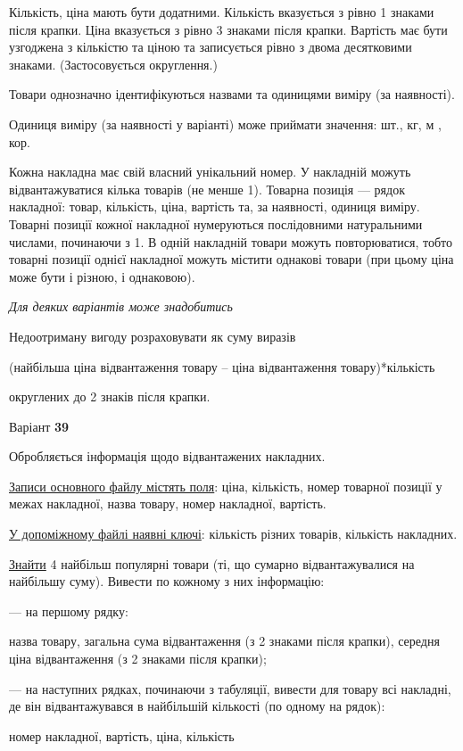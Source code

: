 \documentclass[11pt, ukrainian]{article}
\begin{document}
Кількість, ціна мають бути додатними.
Кількість вказується з рівно 1 знаками після крапки.
Ціна вказується з рівно 3 знаками після крапки.
Вартість має бути узгоджена з кількістю та ціною та записується рівно з двома десятковими знаками.
(Застосовується округлення.)

Товари однозначно ідентифікуються назвами та одиницями виміру (за наявності).

Одиниця виміру (за наявності у варіанті) може приймати значення: шт., кг, м , кор.

Кожна накладна має свій власний унікальний номер.
У накладній можуть відвантажуватися кілька товарів (не менше 1).
Товарна позиція --- рядок накладної: товар, кількість, ціна, вартість та, за наявності, одиниця виміру.
Товарні позиції кожної накладної нумеруються послідовними натуральними числами, починаючи з 1.
В одній накладній товари можуть повторюватися, 
тобто товарні позиції однієї накладної можуть містити однакові товари 
(при цьому ціна може бути і різною, і однаковою).

\bigskip\textit{Для деяких варіантів може знадобитись}

Недоотриману вигоду розраховувати як суму виразів
{\center (найбільша ціна відвантаження товару – ціна відвантаження товару)*кількість\par}

\bigskip
{\noindent} округлених до 2 знаків після крапки.




\par
\newpage
{\center Варіант  \No \textbf { 39 }\par}
\bigskip
Обробляється інформація щодо відвантажених накладних.

\underline{Записи основного файлу містять поля}: ціна, кількість, номер товарної позиції у межах накладної, назва товару, номер накладної, вартість.

\underline{У допоміжному файлі наявні ключі}: кількість різних товарів, кількість накладних.

\underline{Знайти} 4 найбільш популярні товари (ті, що сумарно відвантажувалися на найбільшу суму). Вивести по кожному з них інформацію:\par
{\noindent}--- на першому рядку:\par
назва товару, загальна сума відвантаження (з 2 знаками після крапки), середня ціна відвантаження (з 2 знаками після крапки);

{\noindent}--- на наступних рядках, починаючи з табуляції, вивести для товару всі накладні, де він відвантажувався в найбільшій кількості (по одному на рядок):\par
номер накладної, вартість, ціна, кількість
\end{document}
